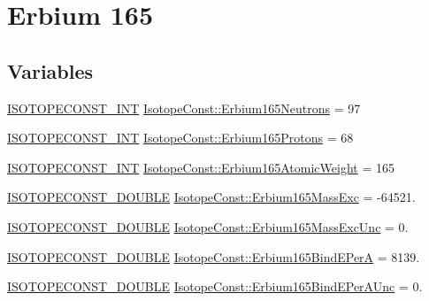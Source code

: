 \hypertarget{group___isotope_const-_erbium-_er165}{}\section{Erbium 165}
\label{group___isotope_const-_erbium-_er165}
\subsection*{Variables}
\begin{DoxyCompactItemize}
\item 
\mbox{\hyperlink{group___isotope_const-_macros_ga5f18360b3e99483a35c32d789e62621c}{I\+S\+O\+T\+O\+P\+E\+C\+O\+N\+S\+T\+\_\+\+I\+NT}} \mbox{\hyperlink{group___isotope_const-_erbium-_er165_ga8ef65ff0ec2779f80ef01dcd03aca40c}{Isotope\+Const\+::\+Erbium165\+Neutrons}} = 97
\item 
\mbox{\hyperlink{group___isotope_const-_macros_ga5f18360b3e99483a35c32d789e62621c}{I\+S\+O\+T\+O\+P\+E\+C\+O\+N\+S\+T\+\_\+\+I\+NT}} \mbox{\hyperlink{group___isotope_const-_erbium-_er165_gaa7098029dafcc99f7afae3ff512e340c}{Isotope\+Const\+::\+Erbium165\+Protons}} = 68
\item 
\mbox{\hyperlink{group___isotope_const-_macros_ga5f18360b3e99483a35c32d789e62621c}{I\+S\+O\+T\+O\+P\+E\+C\+O\+N\+S\+T\+\_\+\+I\+NT}} \mbox{\hyperlink{group___isotope_const-_erbium-_er165_gadcf315375c63e2ed3c7d562bd5bca902}{Isotope\+Const\+::\+Erbium165\+Atomic\+Weight}} = 165
\item 
\mbox{\hyperlink{group___isotope_const-_macros_ga8f45a7272ce02c0b4c65c44636ed719a}{I\+S\+O\+T\+O\+P\+E\+C\+O\+N\+S\+T\+\_\+\+D\+O\+U\+B\+LE}} \mbox{\hyperlink{group___isotope_const-_erbium-_er165_gafae432d83e59b4b7a48dd346c230eb39}{Isotope\+Const\+::\+Erbium165\+Mass\+Exc}} = -\/64521.
\item 
\mbox{\hyperlink{group___isotope_const-_macros_ga8f45a7272ce02c0b4c65c44636ed719a}{I\+S\+O\+T\+O\+P\+E\+C\+O\+N\+S\+T\+\_\+\+D\+O\+U\+B\+LE}} \mbox{\hyperlink{group___isotope_const-_erbium-_er165_ga8ca2112c7b44f6a4c8b636921674ab9e}{Isotope\+Const\+::\+Erbium165\+Mass\+Exc\+Unc}} = 0.
\item 
\mbox{\hyperlink{group___isotope_const-_macros_ga8f45a7272ce02c0b4c65c44636ed719a}{I\+S\+O\+T\+O\+P\+E\+C\+O\+N\+S\+T\+\_\+\+D\+O\+U\+B\+LE}} \mbox{\hyperlink{group___isotope_const-_erbium-_er165_gae482f8321cd73b9d0878221c4cbd75b3}{Isotope\+Const\+::\+Erbium165\+Bind\+E\+PerA}} = 8139.
\item 
\mbox{\hyperlink{group___isotope_const-_macros_ga8f45a7272ce02c0b4c65c44636ed719a}{I\+S\+O\+T\+O\+P\+E\+C\+O\+N\+S\+T\+\_\+\+D\+O\+U\+B\+LE}} \mbox{\hyperlink{group___isotope_const-_erbium-_er165_ga83fca8da271a85facda084f243e33fc5}{Isotope\+Const\+::\+Erbium165\+Bind\+E\+Per\+A\+Unc}} = 0.

\end{DoxyCompactItemize}
